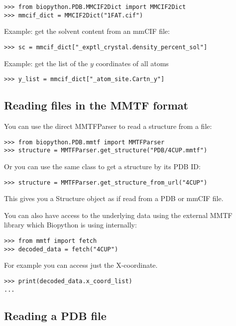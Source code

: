\begin{verbatim}
>>> from biopython.PDB.MMCIF2Dict import MMCIF2Dict
>>> mmcif_dict = MMCIF2Dict("1FAT.cif")
\end{verbatim}

Example: get the solvent content from an mmCIF file:
\begin{verbatim}
>>> sc = mmcif_dict["_exptl_crystal.density_percent_sol"]
\end{verbatim}

Example: get the list of the $y$ coordinates of all atoms
\begin{verbatim}
>>> y_list = mmcif_dict["_atom_site.Cartn_y"]
\end{verbatim}


\subsection{Reading files in the MMTF format}

You can use the direct MMTFParser to read a structure from a file:
\begin{verbatim}
>>> from biopython.PDB.mmtf import MMTFParser
>>> structure = MMTFParser.get_structure("PDB/4CUP.mmtf")
\end{verbatim}

Or you can use the same class to get a structure by its PDB ID:
\begin{verbatim}
>>> structure = MMTFParser.get_structure_from_url("4CUP")
\end{verbatim}

This gives you a Structure object as if read from a PDB or mmCIF file.

You can also have access to the underlying data using the external
MMTF library which Biopython is using internally:
\begin{verbatim}
>>> from mmtf import fetch
>>> decoded_data = fetch("4CUP")
\end{verbatim}
For example you can access just the X-coordinate.
\begin{verbatim}
>>> print(decoded_data.x_coord_list)
...
\end{verbatim}

\subsection{Reading a PDB file}

